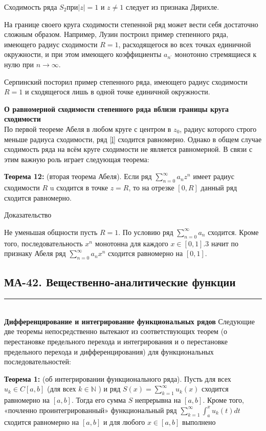 \documentclass[a4paper,12pt]{article} %
\newcommand{\HRule}{\rule{\linewidth}{0.5mm}}
\begin{document}
Сходимость ряда $S_{2} п р и|z|=1$ и $z \neq 1$ следует из признака Дирихле.

На границе своего круга сходимости степенной ряд может вести себя достаточно сложным образом. Например, Лузин построил пример степенного ряда, имеющего радиус сходимости $R=1$, расходящегося во всех точках единичной окружности, и при этом имеющего коэффициенты $a_{n^{\prime}}$ монотонно стремящиеся к нулю при $n \rightarrow \infty$.

Серпинский посторил пример степенного ряда, имеющего радиус сходимости $R=1$ и сходящегося лишь в одной точке единичной окружности.

\textbf{О равномерной сходимости степенного ряда вблизи границы круга сходимости}\\
По первой теореме Абеля в любом круге с центром в $z_{0}$, радиус которого строго меньше радиуса сходимости, ряд \eqref{l} сходится равномерно. Однако в общем случае сходимость ряда на всём круге сходимости не является равномерной. В связи с этим важную роль играет следующая теорема:

\textbf{Теорема 12:} (вторая теорема Абеля). Если ряд $\sum_{n=0}^{\infty} a_{n} z^{n}$ имеет радиус сходимости $R$ u сходится в точке $z=R$, то на отрезке $[0, R]$ данный ряд сходится равномерно.

Доказательство

Не уменьшая общности пусть $R=1$. По условию ряд $\sum_{n=0}^{\infty} a_n$ сходится. Кроме того, последовательность $x^n$ монотонна для каждого $x \in[0,1] .3$ начит по признаку Абеля ряд $\sum_{n=0}^{\infty} a_n x^n$ сходится равномерно на $[0,1]$.


\newpage
\begin{LARGE}
\begin{center}
	\section{МА-42. Вещественно-аналитические функции }
\end{center}
\end{LARGE}
\HRule \\


\textbf{Дифференцирование и интегрирование функциональных рядов}
Следующие две теоремы непосредственно вытекают из соответствующих теорем (о перестановке предельного перехода и интегрирования и о перестановке предельного перехода и дифференцирования) для функциональных последовательностей:

\textbf{Теорема 1:} (об интегрировании функционального ряда). Пусть для всех $u_{k} \in C[a, b]$ (для всех $k \in \mathbb{N}$ ) и ряд $S(x)=\sum_{k=1}^{\infty} u_{k}(x)$ сходится равномерно на $[a, b]$. Тогда его сумма $S$ непрерывна на $[a, b]$. Кроме того, «почленно проинтегрированный» функциональный ряд $\sum_{k=1}^{\infty} \int_{a}^{x} u_{k}(t) d t$ сходится равномерно на $[a, b]$ и для любого $x \in[a, b]$ выполнено
\end{document}
